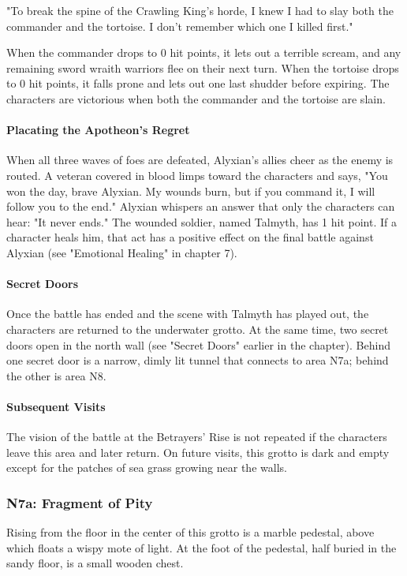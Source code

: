 \documentclass[10pt,a4paper,twoside,bg=print,twocolumn,openany,nodeprecatedcode]{dndbook}
\begin{document}
\begin{DndReadAloud}{}
"To break the spine of the Crawling King's horde, I knew I had to slay both the commander and the tortoise. I don't remember which one I killed first."

\end{DndReadAloud}

When the commander drops to 0 hit points, it lets out a terrible scream, and any remaining sword wraith warriors flee on their next turn. When the tortoise drops to 0 hit points, it falls prone and lets out one last shudder before expiring. The characters are victorious when both the commander and the tortoise are slain.

\paragraph{Placating the Apotheon's Regret}
When all three waves of foes are defeated, Alyxian's allies cheer as the enemy is routed. A veteran covered in blood limps toward the characters and says, "You won the day, brave Alyxian. My wounds burn, but if you command it, I will follow you to the end." Alyxian whispers an answer that only the characters can hear: "It never ends." The wounded soldier, named Talmyth, has 1 hit point. If a character heals him, that act has a positive effect on the final battle against Alyxian (see "Emotional Healing" in chapter 7).

\paragraph{Secret Doors}
Once the battle has ended and the scene with Talmyth has played out, the characters are returned to the underwater grotto. At the same time, two secret doors open in the north wall (see "Secret Doors" earlier in the chapter). Behind one secret door is a narrow, dimly lit tunnel that connects to area N7a; behind the other is area N8.

\paragraph{Subsequent Visits}
The vision of the battle at the Betrayers' Rise is not repeated if the characters leave this area and later return. On future visits, this grotto is dark and empty except for the patches of sea grass growing near the walls.

\subsubsection{N7a: Fragment of Pity}
\begin{DndReadAloud}{}
Rising from the floor in the center of this grotto is a marble pedestal, above which floats a wispy mote of light. At the foot of the pedestal, half buried in the sandy floor, is a small wooden chest.

\end{DndReadAloud}
\end{document}
